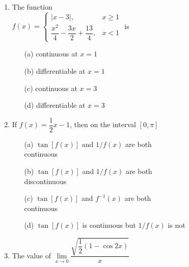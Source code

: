 \begin{enumerate}[label=\arabic*.,ref=\thesubsection.\theenumi]
\item The function \\$f(x)=\begin{cases}
|x-3|, & \text{$x\geq 1$}\\
\dfrac{x^2}{4}-\dfrac{3x}{2}+\dfrac{13}{4}, & \text{$x < 1$}
\end{cases}$ is\\
\begin{itemize}
\item[(a)] continuous at $x=1$ \item[(b)] differentiable at $x=1$ \item[(c)] continuous at $x=3$ \item[(d)] differentiable at $x=3$
\end{itemize}

\item If $f(x)=\dfrac{1}{2}x-1$, then on the interval $[0,\pi]$
\begin{itemize}
\item[(a)] $\tan[f(x)]$ and $1/f(x)$ are both\\ continuous
\item[(b)] $\tan[f(x)]$ and $1/f(x)$ are both\\ discontinuous
\item[(c)] $\tan[f(x)]$ and $f^{-1}(x)$ are both\\ continuous
\item[(d)] $\tan[f(x)]$ is continuous but $1/f(x)$ is not
\end{itemize}

\item The value of $\lim\limits_{x \to 0}\dfrac{\sqrt{\dfrac{1}{2}(1-\cos 2x)}}{x}$
\begin{itemize}
\end{itemize}


\end{enumerate}
